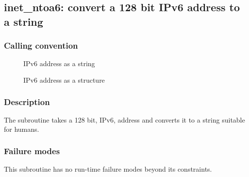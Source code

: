 \clearpage
{}
{}
\label{subr:inet-ntoa6}
\subsection*{inet\_ntoa6: convert a 128 bit IPv6 address to a string}

\subsubsection*{Calling convention}

\begin{description}
\item[] IPv6 address as a string
\item[] IPv6 address as a structure
\end{description}

\subsubsection*{Description}

The  subroutine takes a 128 bit, IPv6, address
and converts it to a string suitable for humans.

\subsubsection*{Failure modes}

This subroutine has no run-time failure modes beyond its constraints.
